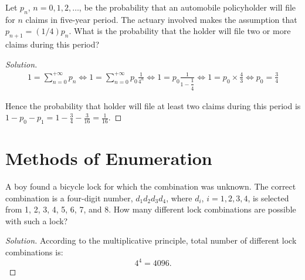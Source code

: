 \documentclass[class=probandstats,crop=false]{standalone}
\begin{document}
\begin{exercise}
    \par Let $p_{n}$, $n = 0, 1, 2,\ldots$, be the probability that an automobile policyholder will file for $n$ claims in five-year period. The actuary involved makes the assumption that $p_{n+1} = (1/4)p_{n}$. What is the probability that the holder will file two or more claims during this period?
\end{exercise}

\begin{proof}[Solution]
    \begin{gather*}
        1 = \sum^{+\infty}_{n=0}p_{n}
        \Leftrightarrow 1 = \sum^{+\infty}_{n=0}p_{0}\frac{1}{4^{n}}
        \Leftrightarrow 1 = p_{0}\frac{1}{1 - \dfrac{1}{4}}
        \Leftrightarrow 1 = p_{0}\times\frac{4}{3}
        \Leftrightarrow p_{0} = \frac{3}{4}
    \end{gather*}
    \par Hence the probability that holder will file at least two claims during this period is $1 - p_{0} - p_{1} = 1 - \frac{3}{4} - \frac{3}{16} = \frac{1}{16}$.
\end{proof}


\section{Methods of Enumeration}

\begin{exercise}
    \par A boy found a bicycle lock for which the combination was unknown. The correct combination is a four-digit number, $d_{1}d_{2}d_{3}d_{4}$, where $d_{i}$, $i = 1, 2, 3, 4$, is selected from 1, 2, 3, 4, 5, 6, 7, and 8. How many different lock combinations are possible with such a lock?
\end{exercise}

\begin{proof}[Solution]
    \par According to the multiplicative principle, total number of different lock combinations is:
    \[
        4^{4} = 4096.
    \]
\end{proof}
\end{document}
